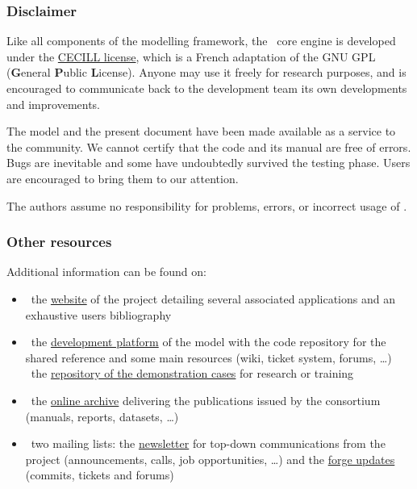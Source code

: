 
\thispagestyle{plain}

\subsubsection*{Disclaimer}

Like all components of the modelling framework,
the \engine\ core engine is developed under the \href{http://www.cecill.info}{CECILL license},
which is a French adaptation of the GNU GPL (\textbf{G}eneral \textbf{P}ublic \textbf{L}icense).
Anyone may use it freely for research purposes, and is encouraged to
communicate back to the development team its own developments and improvements.

The model and the present document have been made available as a service to the community.
We cannot certify that the code and its manual are free of errors.
Bugs are inevitable and some have undoubtedly survived the testing phase.
Users are encouraged to bring them to our attention.

The authors assume no responsibility for problems, errors, or incorrect usage of \NEMO.

\subsubsection*{Other resources}
\label{resources}

Additional information can be found on:
\begin{itemize}
\item \faWordpress\ the \href{http://www.nemo-ocean.eu}{website} of the project detailing several
  associated applications and an exhaustive users bibliography
\item \faCodeFork\ the \href{http://forge.ipsl.jussieu.fr/nemo}{development platform} of
  the model with the code repository for the shared reference and some main resources
  (wiki, ticket system, forums, \ldots) \\
  \faGithub\ the \href{http://github.com/NEMO-ocean/NEMO-examples}
  {repository of the demonstration cases} for research or training
\item \faCloudDownload\ the \href{http://zenodo.org/communities/nemo-ocean}{online archive}
  delivering the publications issued by the consortium (manuals, reports, datasets, \ldots)
\item \faEnvelope\ two mailing lists:
  the \href{http://listes.ipsl.fr/sympa/info/nemo-newsletter}{newsletter} for
  top-down communications from the project
  (announcements, calls, job opportunities, \ldots)
  and the \href{http://listes.ipsl.fr/sympa/info/nemo-forge}{forge updates}
  (commits, tickets and forums)
\end{itemize}

